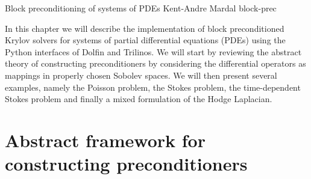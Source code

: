 

              {Block preconditioning of systems of PDEs}
              {Kent-Andre Mardal}
              {block-prec}

In this chapter we will describe the implementation of block preconditioned
Krylov solvers for systems of partial differential equations (PDEs) using
the Python interfaces of Dolfin and Trilinos. 
We will start by reviewing the
abstract theory of constructing preconditioners by considering the
differential operators as mappings in properly chosen Sobolev spaces. 
We will then
present several examples, namely the Poisson problem, the Stokes problem, 
the time-dependent Stokes problem and finally a mixed formulation
of the Hodge Laplacian. 

\section{Abstract framework for constructing preconditioners}

